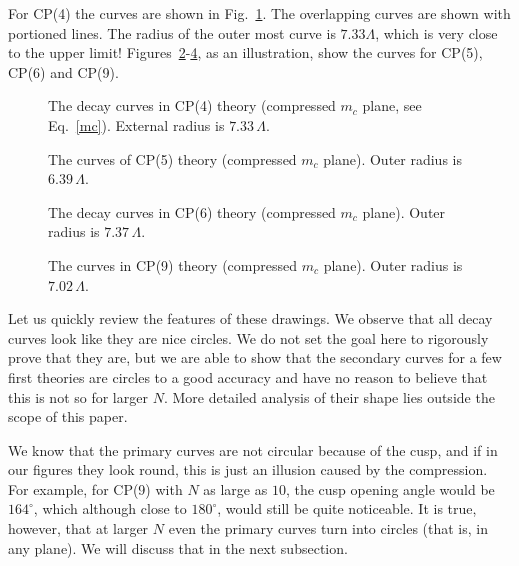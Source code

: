 \documentclass[epsfig,12pt]{article}
\begin{document}
	For CP(4) the curves are shown in Fig.~\ref{ccp4}. 
	The overlapping curves are shown with portioned lines. 
	The radius of the outer most curve is $ 7.33 \Lambda $, which is very close to the upper limit!
	Figures~\ref{ccp5}-\ref{ccp9}, as an illustration, show the curves for CP(5), CP(6) and CP(9).
\begin{figure}
\begin{center}
\epsfxsize=7.5cm
\caption{\small The decay curves in CP(4) theory (compressed $ m_c $ plane, see Eq.~\eqref{mc}).
External radius is $ 7.33\, \Lambda $.} 
\label{ccp4}
\end{center}
\end{figure}
\begin{figure}
\begin{center}
\epsfxsize=7.5cm
\caption{\small The curves of CP(5) theory (compressed $ m_c $ plane). Outer radius is $ 6.39\, \Lambda $.} 
\label{ccp5}
\end{center}
\end{figure}
\begin{figure}
\begin{center}
\epsfxsize=7.5cm
\caption{\small The decay curves in CP(6) theory (compressed $ m_c $ plane). Outer radius is $ 7.37\, \Lambda $.} 
\label{ccp6}
\end{center}
\end{figure}
\begin{figure}
\begin{center}
\epsfxsize=7.5cm
\caption{\small The curves in CP(9) theory (compressed $ m_c $ plane). Outer radius is $ 7.02\, \Lambda $.}
\label{ccp9}
\end{center}
\end{figure}

	Let us quickly review the features of these drawings. 
	We observe that all decay curves look like they are nice circles.
	We do not set the goal here to rigorously prove that they are, 
	but we are able to show that the secondary curves for a few first theories are circles to a 
	good accuracy and have no reason to believe that this is not so for larger $ N $.
	More detailed analysis of their shape lies outside the scope of this paper.

	We know that the primary curves are not circular because of the cusp, and if in our figures 
	they look round, this is just an illusion caused by the compression. 
	For example, for CP(9) with $ N $ as large as $ 10 $, the cusp opening angle would be $ 164^\circ $, 
	which although close to $ 180^\circ $, would still be quite noticeable.
	It is true, however, that at larger $ N $ even the primary curves turn into circles (that is,
	in any plane).
	We will discuss that in the next subsection.
\end{document}
